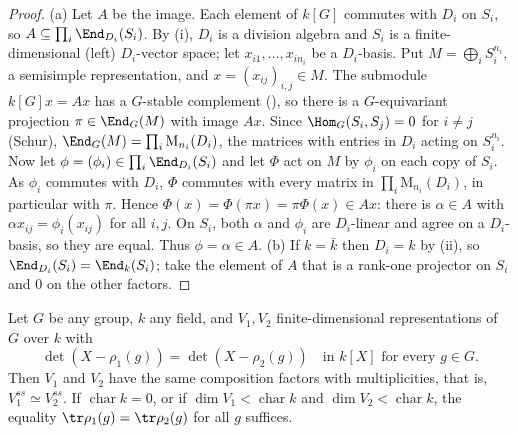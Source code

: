 \begin{proof}
(a) Let $A$ be the image. Each element of $k[G]$ commutes with $D_i$ on $S_i$, so $A\subseteq\prod_i\End_{D_i}(S_i)$. By (i), $D_i$ is a
division algebra and $S_i$ is a finite-dimensional (left) $D_i$-vector space; let $x_{i1},\dots,x_{in_i}$ be a $D_i$-basis. Put
$M=\bigoplus_iS_i^{n_i}$, a semisimple representation, and $x=(x_{ij})_{i,j}\in M$. The submodule $k[G]x=Ax$ has a $G$-stable complement
(), so there is a $G$-equivariant projection $\pi\in\End_G(M)$ with image $Ax$. Since $\Hom_G(S_i,S_j)=0$ for $i\ne j$
(Schur), $\End_G(M)=\prod_i\mathrm M_{n_i}(D_i)$, the matrices with entries in $D_i$ acting on $S_i^{n_i}$. Now let $\phi=(\phi_i)\in\prod_i\End_{D_i}(S_i)$ and let $\Phi$ act on
$M$ by $\phi_i$ on each copy of $S_i$. As $\phi_i$ commutes with $D_i$, $\Phi$ commutes with every matrix in $\prod_i\mathrm M_{n_i}(D_i)$, in particular with
$\pi$. Hence $\Phi(x)=\Phi(\pi x)=\pi\Phi(x)\in Ax$: there is $\alpha\in A$ with $\alpha x_{ij}=\phi_i(x_{ij})$ for all $i,j$. On $S_i$, both $\alpha$ and $\phi_i$ are
$D_i$-linear and agree on a $D_i$-basis, so they are equal. Thus $\phi=\alpha\in A$.
(b) If $k=\bar k$ then $D_i=k$ by (ii), so $\End_{D_i}(S_i)=\End_k(S_i)$; take the element of $A$ that is a rank-one projector
on $S_i$ and $0$ on the other factors.
\end{proof}

\begin{theorem}\label{thm:reps:brauer-nesbitt}
Let $G$ be any group, $k$ any field, and $V_1,V_2$ finite-dimensional representations of $G$ over $k$ with
\[
\det(X-\rho_1(g))=\det(X-\rho_2(g))\quad\text{in }k[X]\text{ for every }g\in G.
\]
Then $V_1$ and $V_2$ have the same composition factors with multiplicities, that is, $V_1^{ss}\simeq V_2^{ss}$. If $\operatorname{char}k=0$, or if
$\dim V_1<\operatorname{char}k$ and $\dim V_2<\operatorname{char}k$, the equality $\tr\rho_1(g)=\tr\rho_2(g)$ for all $g$ suffices.
\end{theorem}

